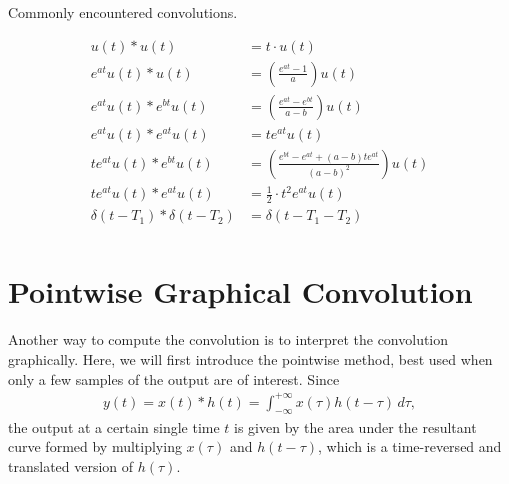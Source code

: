 \documentclass{report}
\begin{document}
\begin{table}[hbt!]
    \centering
    \caption{Commonly encountered convolutions.}
    \label{common_conv}
    \begin{mdframed}
    \begin{align}
        u(t)*u(t) &= t\cdot u(t) \\[0.25cm]
        e^{at}u(t)*u(t) &= \left(\frac{e^{at}-1}{a}\right) u(t) \\[0.25cm]
        e^{at}u(t)*e^{bt}u(t) &= \left(\frac{e^{at}-e^{bt}}{a-b}\right) u(t) \\[0.25cm]
        e^{at}u(t)*e^{at}u(t) &= te^{at} u(t) \\[0.25cm]
        te^{at}u(t)*e^{bt}u(t) &= \left(\frac{e^{bt}-e^{at}+(a-b)te^{at}}{(a-b)^2}\right) u(t) \\[0.25cm]
        te^{at}u(t)*e^{at}u(t) &= \frac{1}{2} \cdot t^2 e^{at} u(t) \\[0.25cm]
        \delta(t-T_1)*\delta(t-T_2) &= \delta(t-T_1-T_2) \\[0.15cm] \nonumber
    \end{align}
    \end{mdframed}
\end{table} 

\section{Pointwise Graphical Convolution}
Another way to compute the convolution is to interpret the convolution graphically. Here, we will first introduce the pointwise method, 
best used when only a few samples of the output are of interest. Since 
\begin{align*}
    y(t) = x(t) * h(t) = \int_{-\infty}^{+\infty} x(\tau)h(t-\tau) \,d\tau,
\end{align*}
the output at a certain single time $t$ is given by the area under the resultant curve formed by multiplying $x(\tau)$ and $h(t-\tau)$, which is a time-reversed and translated 
version of $h(\tau)$. 
\end{document}
